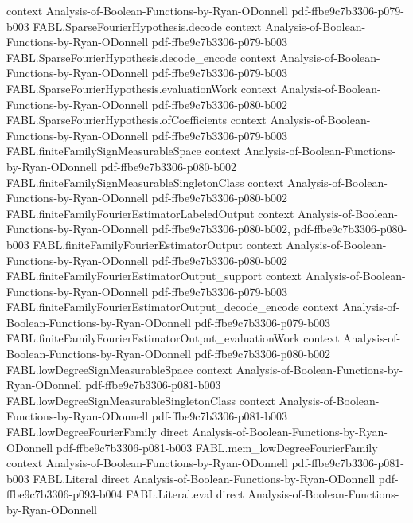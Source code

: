 \begin{theorem}
  {context}
  {Analysis-of-Boolean-Functions-by-Ryan-ODonnell}
  {pdf-ffbe9c7b3306-p079-b003}
\proofstep
  {FABL.SparseFourierHypothesis.decode}
  {context}
  {Analysis-of-Boolean-Functions-by-Ryan-ODonnell}
  {pdf-ffbe9c7b3306-p079-b003}
\proofstep
  {FABL.SparseFourierHypothesis.decode_encode}
  {context}
  {Analysis-of-Boolean-Functions-by-Ryan-ODonnell}
  {pdf-ffbe9c7b3306-p079-b003}
\proofstep
  {FABL.SparseFourierHypothesis.evaluationWork}
  {context}
  {Analysis-of-Boolean-Functions-by-Ryan-ODonnell}
  {pdf-ffbe9c7b3306-p080-b002}
\proofstep
  {FABL.SparseFourierHypothesis.ofCoefficients}
  {context}
  {Analysis-of-Boolean-Functions-by-Ryan-ODonnell}
  {pdf-ffbe9c7b3306-p079-b003}
\proofstep
  {FABL.finiteFamilySignMeasurableSpace}
  {context}
  {Analysis-of-Boolean-Functions-by-Ryan-ODonnell}
  {pdf-ffbe9c7b3306-p080-b002}
\proofstep
  {FABL.finiteFamilySignMeasurableSingletonClass}
  {context}
  {Analysis-of-Boolean-Functions-by-Ryan-ODonnell}
  {pdf-ffbe9c7b3306-p080-b002}
\proofstep
  {FABL.finiteFamilyFourierEstimatorLabeledOutput}
  {context}
  {Analysis-of-Boolean-Functions-by-Ryan-ODonnell}
  {pdf-ffbe9c7b3306-p080-b002,
    pdf-ffbe9c7b3306-p080-b003}
\proofstep
  {FABL.finiteFamilyFourierEstimatorOutput}
  {context}
  {Analysis-of-Boolean-Functions-by-Ryan-ODonnell}
  {pdf-ffbe9c7b3306-p080-b002}
\proofstep
  {FABL.finiteFamilyFourierEstimatorOutput_support}
  {context}
  {Analysis-of-Boolean-Functions-by-Ryan-ODonnell}
  {pdf-ffbe9c7b3306-p079-b003}
\proofstep
  {FABL.finiteFamilyFourierEstimatorOutput_decode_encode}
  {context}
  {Analysis-of-Boolean-Functions-by-Ryan-ODonnell}
  {pdf-ffbe9c7b3306-p079-b003}
\proofstep
  {FABL.finiteFamilyFourierEstimatorOutput_evaluationWork}
  {context}
  {Analysis-of-Boolean-Functions-by-Ryan-ODonnell}
  {pdf-ffbe9c7b3306-p080-b002}
\proofstep
  {FABL.lowDegreeSignMeasurableSpace}
  {context}
  {Analysis-of-Boolean-Functions-by-Ryan-ODonnell}
  {pdf-ffbe9c7b3306-p081-b003}
\proofstep
  {FABL.lowDegreeSignMeasurableSingletonClass}
  {context}
  {Analysis-of-Boolean-Functions-by-Ryan-ODonnell}
  {pdf-ffbe9c7b3306-p081-b003}
\proofstep
  {FABL.lowDegreeFourierFamily}
  {direct}
  {Analysis-of-Boolean-Functions-by-Ryan-ODonnell}
  {pdf-ffbe9c7b3306-p081-b003}
\proofstep
  {FABL.mem_lowDegreeFourierFamily}
  {context}
  {Analysis-of-Boolean-Functions-by-Ryan-ODonnell}
  {pdf-ffbe9c7b3306-p081-b003}
\proofstep
  {FABL.Literal}
  {direct}
  {Analysis-of-Boolean-Functions-by-Ryan-ODonnell}
  {pdf-ffbe9c7b3306-p093-b004}
\proofstep
  {FABL.Literal.eval}
  {direct}
  {Analysis-of-Boolean-Functions-by-Ryan-ODonnell}

\end{theorem}
